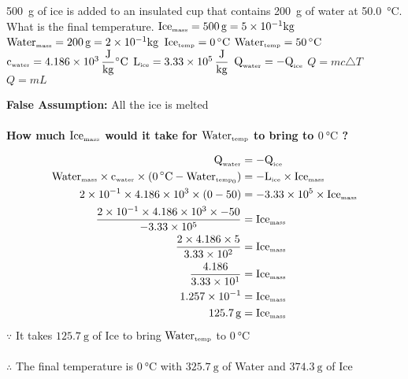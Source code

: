 \documentclass{article}
\begin{document}
\begin{outline}[enumerate]
\newpage






\1 \SI{500}{\gram} of ice is added to an insulated cup that contains \SI{200}{g} of water at \SI{50.0}{\celsius}. What is the final temperature.
	\2 $\mbox{Ice}_{\tiny{\mbox{mass}}} = \SI{500}{\gram} = 5 \times 10^{-1} \SI{}{\kilogram}$
	\2 $\mbox{Water}_{\tiny{\mbox{mass}}} = \SI{200}{\gram} = 2 \times 10^{-1} \SI{}{\kilogram}$
	\2 $\mbox{Ice}_{\tiny{\mbox{temp}}} = \SI{0}{\celsius}$
	\2 $\mbox{Water}_{\tiny{\mbox{temp}}} = \SI{50}{\celsius}$
	\2 $\mbox{c}_{\tiny{\mbox{water}}} = 4.186 \times 10^3  \, \dfrac{\SI{}{\joule}}{\SI{}{\kilogram}}\SI{}{\celsius}$
	\2 $\mbox{L}_{\tiny{\mbox{ice}}} = 3.33 \times 10^5  \, \dfrac{\SI{}{\joule}}{\SI{}{\kilogram}}$
	\2 $\mbox{Q}_{\tiny{\mbox{water}}} = -\mbox{Q}_{\tiny{\mbox{ice}}}$
	\2 $Q = mc \triangle T$
	\2 $Q = mL $
	
	\2 \textbf{False Assumption:} All the ice is melted \\\\
	
	\textbf{How much $\mbox{Ice}_{\tiny{\mbox{mass}}}$ would it take for $\mbox{Water}_{\tiny{\mbox{temp}}}$ to bring to $0\SI{}{\celsius}$ ?}
	
\begin{alignat*}{2}
\mbox{Q}_{\tiny{\mbox{water}}} &= -\mbox{Q}_{\tiny{\mbox{ice}}} \\
\mbox{Water}_{\tiny{\mbox{mass}}} \times \mbox{c}_{\tiny{\mbox{water}}} \times (\SI{0}{\celsius} - \mbox{Water}_{\mbox{\tiny{temp}}_0})
&= -\mbox{L}_{\tiny{\mbox{ice}}} \times \mbox{Ice}_{\tiny{\mbox{mass}}} \\
2 \times 10^{-1} \times 4.186 \times 10^3 \times (0 - 50) 
&= -3.33 \times 10^5 \times \mbox{Ice}_{\tiny{\mbox{mass}}} \\
\dfrac{2 \times 10^{-1} \times 4.186 \times 10^3 \times -50}{-3.33 \times 10^5}
&= \mbox{Ice}_{\tiny{\mbox{mass}}} \\
\dfrac{2 \times 4.186 \times 5}{3.33 \times 10^2}
&= \mbox{Ice}_{\tiny{\mbox{mass}}} \\
\dfrac{4.186}{3.33 \times 10^1}
&= \mbox{Ice}_{\tiny{\mbox{mass}}} \\
1.257 \times 10^{-1}
&= \mbox{Ice}_{\tiny{\mbox{mass}}} \\
\SI{125.7}{\gram}
&= \mbox{Ice}_{\tiny{\mbox{mass}}} \\
\end{alignat*}	
$\because$ It takes $\SI{125.7}{\gram}$ of Ice to bring $\mbox{Water}_{\mbox{\tiny{temp}}}$ to $\SI{0}{\celsius}$ \\\\
$\therefore$ The final temperature is $0\SI{}{\celsius}$ with $\SI{325.7}{\gram}$ of Water and $\SI{374.3}{\gram}$ of Ice
	

\end{outline}
\end{document}
